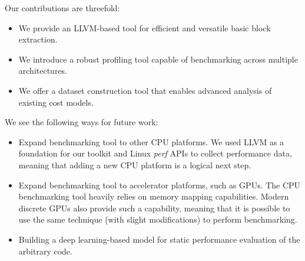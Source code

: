 Our contributions are threefold:
\begin{itemize}
    \item We provide an LLVM-based tool for efficient and versatile basic block extraction.
    \item We introduce a robust profiling tool capable of benchmarking across multiple architectures.
    \item We offer a dataset construction tool that enables advanced analysis of existing cost models.
\end{itemize}

We see the following ways for future work:
\begin{itemize}
  \item Expand benchmarking tool to other CPU platforms. We used LLVM as a foundation for our 
    toolkit and Linux \textit{perf} APIs to collect performance data, meaning that adding a new CPU
        platform is a logical next step.
  \item Expand benchmarking tool to accelerator platforms, such as GPUs. The CPU benchmarking tool
        heavily relies on memory mapping capabilities. Modern discrete GPUs also provide such a capability,
        meaning that it is possible to use the same technique (with slight modifications) to perform benchmarking.
  \item Building a deep learning-based model for static performance evaluation of the arbitrary code.
\end{itemize}
